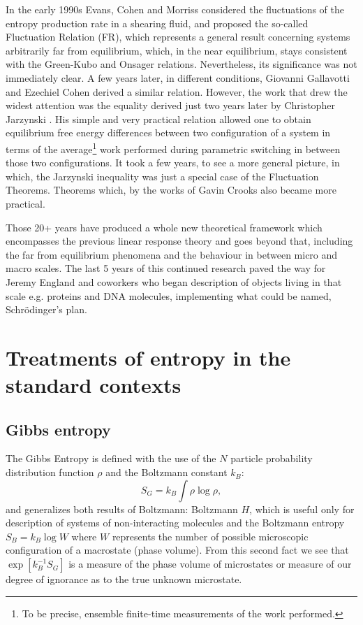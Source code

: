 \documentclass[a4paper,12pt]{article}
\begin{document}
In the early 1990s Evans, Cohen and Morriss \cite{Evans:1993bl} considered the fluctuations of the entropy production rate in a shearing fluid, and proposed the so-called Fluctuation Relation (FR), which represents a general result concerning systems arbitrarily far from equilibrium, which, in the near equilibrium,  stays consistent with the Green-Kubo and Onsager relations. Nevertheless, its significance was not immediately clear.
A few years later, in different conditions, Giovanni Gallavotti and Ezechiel Cohen \cite{Gallavotti:1995gy} derived a similar relation. However, the work that drew the widest attention was the equality derived just two years later by Christopher Jarzynski \cite{Jarzynski:1997uj}. 
His simple and very practical relation allowed one to obtain equilibrium free energy differences between two configuration of a system in terms of the average\footnote{To be precise, ensemble finite-time measurements of the work performed.} work performed during parametric switching in between those two configurations.
It took a few years, to see a more general picture, in which, the Jarzynski inequality was just a special case of the Fluctuation Theorems. Theorems which, by the works of Gavin Crooks \cite{Crooks:2008ta} also became more practical. 

Those 20+ years have produced a whole new theoretical framework which encompasses the previous linear response theory and goes beyond that, including the far from equilibrium phenomena and the behaviour in between micro and macro scales. 
The last 5 years of this continued research paved the way for Jeremy England and coworkers \cite{England:2015hl, England:2010fb} who began description of objects living in that scale e.g. proteins and DNA molecules, implementing what could be named, Schrödinger's plan. 

\section{Treatments of entropy in the standard contexts}

\subsection{Gibbs entropy}
\label{Gibbs entropy}
The Gibbs Entropy is defined with the use of the $N$ particle probability distribution function $ \rho $ and the Boltzmann constant $k_B$:
\begin{equation}
  S_G = k_B \int \rho \log{\rho},
\end{equation}
and generalizes both results of Boltzmann:
Boltzmann $H$, which is useful only for description of systems of non-interacting molecules \cite{Jaynes:1965gg} and the Boltzmann entropy $S_B = k_B \log{W}$ where $W$ represents the number of possible microscopic configuration of a macrostate (phase volume). 
From this second fact we see that $\exp[k_B^{-1} S_G]$ is a measure of the phase volume of microstates or measure of our degree of ignorance as to the true unknown microstate.
\end{document}
